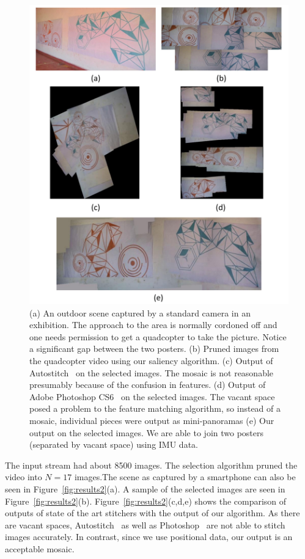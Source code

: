 \documentclass[11pt]{article}
\begin{document}
\begin{figure}[h!]
\centering
\includegraphics[width=0.85\linewidth]{mosaicing/results/orange_blue.pdf}
\caption{(a) An outdoor scene captured by a standard camera in an
  exhibition. The approach to the area is normally cordoned off and one
  needs permission to get a quadcopter to take the picture.  Notice a
  significant gap between the two posters.  (b) Pruned images from the
  quadcopter video using our saliency algorithm. (c) Output of
  Autostitch~\cite{autostitch} on the selected images. The mosaic is not
  reasonable presumably because of the confusion in features. (d) Output of Adobe
  Photoshop CS6~\cite{photoshop} on the selected images. The vacant space posed
  a problem to the feature matching algorithm, so instead of a mosaic,
  individual pieces were output as mini-panoramas (e) Our output on
  the selected images. We are able to join two posters (separated by
  vacant space) using IMU data.}
\label{fig:results1}
\end{figure}

The input stream had about 8500 images. The selection algorithm pruned the video
into $N=17$ images.The scene as captured by a smartphone can also be seen in
Figure~\ref{fig:results2}(a). A sample of the selected images are seen in
Figure~\ref{fig:results2}(b). Figure~\ref{fig:results2}(c,d,e) shows the
comparison of outputs of state of the art stitchers with the output of our
algorithm. As there are vacant spaces, Autostitch~\cite{autostitch} as well as
Photoshop~\cite{photoshop} are not able to stitch images accurately. In
contrast, since we use positional data, our output is an acceptable mosaic.
\end{document}
